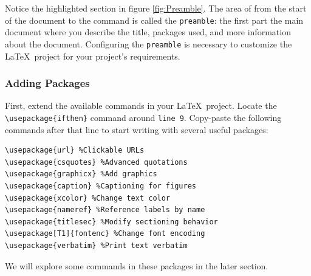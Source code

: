 \begin{minipage}{\linewidth}
\centering
{}
\label{fig:Preamble}
\end{minipage}

Notice the highlighted section in figure \ref{fig:Preamble}. The area of from the start of the document to the \verb|| command is called the \texttt{preamble}: the first part the main document where you describe the title, packages used, and more information about the document. Configuring the \texttt{preamble} is necessary to customize the \LaTeX\ project for your project's requirements.

    \subsubsection{Adding Packages}
First, extend the available commands in your \LaTeX\ project. Locate the \verb|\usepackage{ifthen}| command around \texttt{line 9}. Copy-paste the following commands after that line to start writing with several useful packages:
\par
\begin{minipage}{\linewidth}
\begin{verbatim}
\usepackage{url} %Clickable URLs
\usepackage{csquotes} %Advanced quotations
\usepackage{graphicx} %Add graphics
\usepackage{caption} %Captioning for figures
\usepackage{xcolor} %Change text color
\usepackage{nameref} %Reference labels by name
\usepackage{titlesec} %Modify sectioning behavior
\usepackage[T1]{fontenc} %Change font encoding
\usepackage{verbatim} %Print text verbatim
\end{verbatim}
\end{minipage}
\par
We will explore some commands in these packages in the later  section.\\

